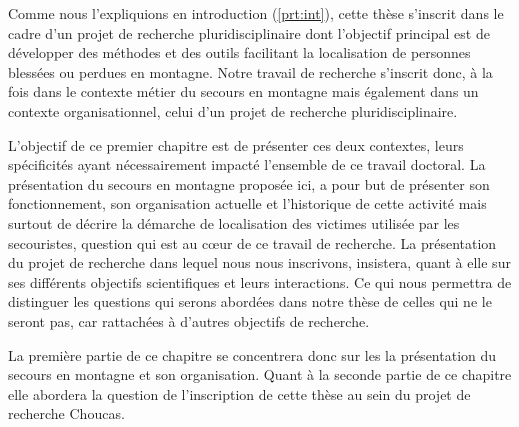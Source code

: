 Comme nous l'expliquions en introduction (\autoref{prt:int}), cette
thèse s'inscrit dans le cadre d'un projet de recherche
pluridisciplinaire dont l'objectif principal est de développer des
méthodes et des outils facilitant la localisation de personnes
blessées ou perdues en montagne. Notre travail de recherche s'inscrit
donc, à la fois dans le contexte métier du secours en montagne mais
également dans un contexte organisationnel, celui d'un projet de
recherche pluridisciplinaire.

L'objectif de ce premier chapitre est de présenter ces deux contextes,
leurs spécificités ayant nécessairement impacté l'ensemble de ce
travail doctoral. La présentation du secours en montagne proposée ici,
a pour but de présenter son fonctionnement, son organisation actuelle
et l'historique de cette activité mais surtout de décrire la démarche
de localisation des victimes utilisée par les secouristes, question
qui est au cœur de ce travail de recherche. La présentation du projet
de recherche dans lequel nous nous inscrivons, insistera, quant à elle
sur ses différents objectifs scientifiques et leurs interactions. Ce qui
nous permettra de distinguer les questions qui serons abordées
dans notre thèse de celles qui ne le seront pas, car rattachées à
d'autres objectifs de recherche.

La première partie de ce chapitre se concentrera donc sur les la
présentation du secours en montagne et son organisation. Quant à la
seconde partie de ce chapitre elle abordera la question de
l'inscription de cette thèse au sein du projet de recherche Choucas.

